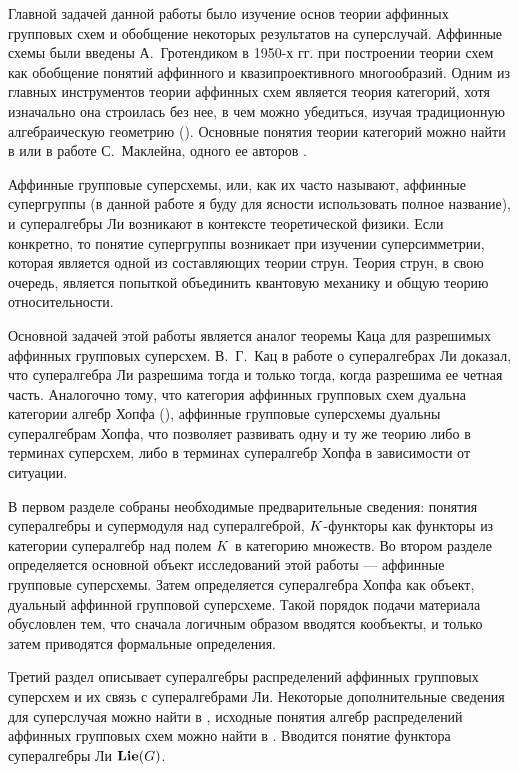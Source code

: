 Главной задачей данной работы было изучение основ теории аффинных групповых
схем и обобщение некоторых результатов на суперслучай.
Аффинные схемы были введены А.~Гротендиком в 1950-х гг. при построении теории схем
как обобщение понятий аффинного и квазипроективного многообразий.
Одним из главных инструментов теории аффинных схем является теория категорий,
хотя изначально она строилась без нее, в чем можно убедиться,
изучая традиционную алгебраическую геометрию (\cite{shafarevich}).
Основные понятия теории категорий можно найти в \cite{category_introduction}
или в работе С.~Маклейна, одного ее авторов \cite{mclane}.

Аффинные групповые суперсхемы, или, как их часто называют, аффинные супергруппы
(в данной работе я буду для ясности использовать полное название), и
супералгебры Ли возникают в контексте теоретической физики.
Если конкретно, то понятие супергруппы возникает при изучении суперсимметрии,
которая является одной из составляющих теории струн. Теория струн, в свою очередь,
является попыткой объединить квантовую механику и общую теорию относительности.

Основной задачей этой работы является аналог теоремы Каца
для разрешимых аффинных групповых суперсхем. В.~Г.~Кац в работе \cite{kac}
о супералгебрах Ли доказал, что супералгебра Ли разрешима тогда и только тогда,
когда разрешима ее четная часть. Аналогочно тому, что категория аффинных
групповых схем дуальна категории алгебр Хопфа (\cite{waterhouse}), аффинные
групповые суперсхемы дуальны супералгебрам Хопфа,
что позволяет развивать одну и ту же теорию либо в терминах суперсхем,
либо в терминах супералгебр Хопфа в зависимости от ситуации.

%
В первом разделе собраны необходимые предварительные сведения: 
понятия супералгебры и супермодуля над супералгеброй, $K$-функторы как функторы
из категории супералгебр над полем $K$ в категорию множеств.
Во втором разделе определяется основной объект исследований этой работы ---
аффинные групповые суперсхемы. Затем определяется супералгебра Хопфа
как объект, дуальный аффинной групповой суперсхеме. Такой порядок подачи материала
обусловлен тем, что сначала логичным образом вводятся кообъекты,
и только затем приводятся формальные определения.


Третий раздел описывает супералгебры распределений аффинных групповых суперсхем
и их связь с супералгебрами Ли. Некоторые дополнительные сведения для суперслучая
можно найти в \cite{affine_quotients}, исходные понятия алгебр распределений
аффинных групповых схем можно найти в \cite{waterhouse}.
Вводится понятие функтора супералгебры Ли $ \mathbf{Lie}(G) $.

